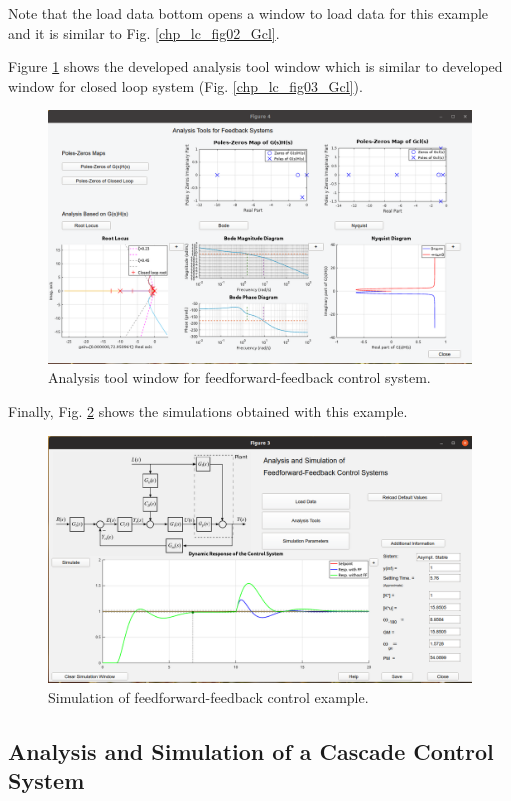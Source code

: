 Note that the load data bottom opens a window to load data for this example and it is similar to Fig. \ref{chp_lc_fig02_Gcl}.

Figure \ref{chpECA_fig03_ejemECA} shows the developed analysis tool window which is similar to developed window for closed loop system (Fig. \ref{chp_lc_fig03_Gcl}).
\begin{figure}[H]
	\centering
	\includegraphics[scale=0.5]{./figuras/chapter_eca/fig03EjemECA.png}
	\caption{Analysis tool window for feedforward-feedback control system.}
	\label{chpECA_fig03_ejemECA}
\end{figure}

Finally, Fig. \ref{chpECA_fig04_ejemECA} shows the simulations obtained with this example.
\begin{figure}[H]
	\centering
	\includegraphics[scale=0.5]{./figuras/chapter_eca/fig04EjemECA.png}
	\caption{Simulation of feedforward-feedback control example.}
	\label{chpECA_fig04_ejemECA}
\end{figure}


\subsection{Analysis and Simulation of a Cascade Control System}

